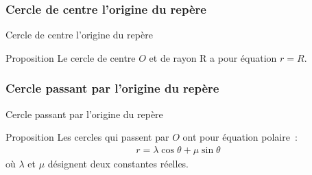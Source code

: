 \documentclass[14pt]{beamer}
\begin{document}
\subsubsection{Cercle de centre l'origine du repère}
\begin{frame}{Cercle de centre l'origine du repère}
        \begin{alertblock}{Proposition}
                Le cercle de centre $O$ et de rayon R a pour équation $r=R$.
        \end{alertblock}
\end{frame}
\subsubsection{Cercle passant par l'origine du repère}
\begin{frame}{Cercle passant par l'origine du repère}
        \begin{alertblock}{Proposition}
                Les cercles qui passent par $O$
                ont pour équation polaire~:
                \begin{align*}
                        r=\lambda\cos\theta+\mu\sin\theta
                \end{align*}
                où $\lambda$ et $\mu$ désignent deux constantes réelles.
        \end{alertblock}
\end{frame}
\end{document}
